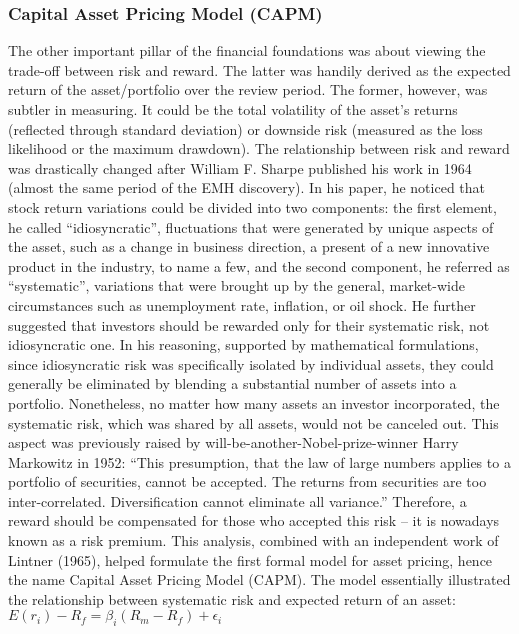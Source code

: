 \subsubsection{Capital Asset Pricing Model (CAPM)}
The other important pillar of the financial foundations was about viewing the trade-off between risk and reward. The latter was handily derived as the expected return of the asset/portfolio over the review period. The former, however, was subtler in measuring. It could be the total volatility of the asset’s returns (reflected through standard deviation) or downside risk (measured as the loss likelihood or the maximum drawdown). The relationship between risk and reward was drastically changed after William F. Sharpe published his work in 1964 (almost the same period of the EMH discovery). In his paper, he noticed that stock return variations could be divided into two components: the first element, he called “idiosyncratic”, fluctuations that were generated by unique aspects of the asset, such as a change in business direction, a present of a new innovative product in the industry, to name a few, and the second component, he referred as “systematic”, variations that were brought up by the general, market-wide circumstances such as unemployment rate, inflation, or oil shock. He further suggested that investors should be rewarded only for their systematic risk, not idiosyncratic one. In his reasoning, supported by mathematical formulations, since idiosyncratic risk was specifically isolated by individual assets, they could generally be eliminated by blending a substantial number of assets into a portfolio. Nonetheless, no matter how many assets an investor incorporated, the systematic risk, which was shared by all assets, would not be canceled out. This aspect was previously raised by will-be-another-Nobel-prize-winner Harry Markowitz in 1952: “This presumption, that the law of large numbers applies to a portfolio of securities, cannot be accepted. The returns from securities are too inter-correlated. Diversification cannot eliminate all variance.”
Therefore, a reward should be compensated for those who accepted this risk – it is nowadays known as a risk premium. This analysis, combined with an independent work of Lintner (1965), helped formulate the first formal model for asset pricing, hence the name Capital Asset Pricing Model (CAPM). The model essentially illustrated the relationship between systematic risk and expected return of an asset:\\
$ E(r_i)- R_f = \beta_i (R_m-R_f ) + \epsilon_i $\\
